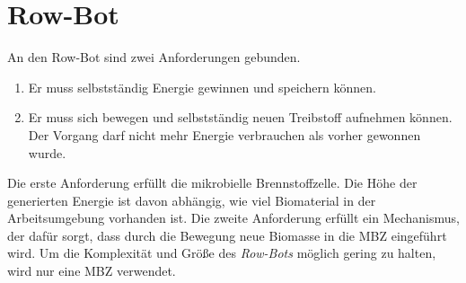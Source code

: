 \documentclass{SeminarV2}
\begin{document}
\section{Row-Bot}\label{sec:rowbot}

An den Row-Bot sind zwei Anforderungen gebunden.

\begin{enumerate}
\item Er muss selbstständig Energie gewinnen und speichern können.
\item Er muss sich bewegen und selbstständig neuen Treibstoff aufnehmen können. Der Vorgang darf nicht mehr Energie verbrauchen als vorher gewonnen wurde.
\end{enumerate}

Die erste Anforderung erfüllt die mikrobielle Brennstoffzelle. Die Höhe der generierten Energie ist davon abhängig, wie viel Biomaterial in der Arbeitsumgebung vorhanden ist. Die zweite Anforderung erfüllt ein Mechanismus, der dafür sorgt, dass durch die Bewegung neue Biomasse in die MBZ eingeführt wird. Um die Komplexität und Größe des \emph{Row-Bots} möglich gering zu halten, wird nur eine MBZ verwendet.\cite[S. 3889]{DBLP:conf/iros/PhilamoreRSI15}
\end{document}
